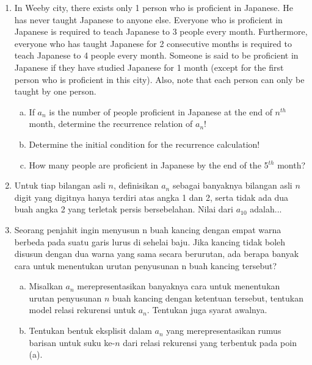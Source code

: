 \documentclass[12pt]{scrartcl}
\begin{document}
\begin{enumerate}
    Berapa minimal langkah yang dibutuhkan untuk memindahkan tumpukan yang berisi 10 piringan?

    \item In Weeby city, there exists only 1 person who is proficient in Japanese. He has never taught Japanese to anyone else. Everyone who is proficient in Japanese is required to teach Japanese to 3 people every month. Furthermore, everyone who has taught Japanese for 2 consecutive months is required to teach Japanese to 4 people every month. Someone is said to be proficient in Japanese if they have studied Japanese for 1 month (except for the first person who is proficient in this city). Also, note that each person can only be taught by one person.
    \begin{enumerate}[a.]
        \item If $a_n$ is the number of people proficient in Japanese at the end of $n^{th}$ month, determine the recurrence relation of $a_n$!
        \item Determine the initial condition for the recurrence calculation!
        \item How many people are proficient in Japanese by the end of the 5$^{th}$ month?
    \end{enumerate}
    
    
    
    \item Untuk tiap bilangan asli $n$, definisikan $a_n$ sebagai banyaknya bilangan asli $n$ digit yang digitnya hanya terdiri atas angka 1 dan 2, serta tidak ada dua buah angka 2 yang terletak persis bersebelahan. Nilai dari $a_{10}$ adalah...

    \item Seorang penjahit ingin menyusun n buah kancing dengan empat warna berbeda pada suatu garis lurus di sehelai baju. Jika kancing tidak boleh disusun dengan dua warna yang sama secara berurutan, ada berapa banyak cara untuk menentukan urutan penyusunan n buah kancing tersebut?
    \begin{enumerate}[a)]
        \item  Misalkan $a_n$ merepresentasikan banyaknya cara untuk menentukan urutan penyusunan $n$ buah kancing dengan ketentuan tersebut, tentukan model relasi rekurensi untuk $a_n$. Tentukan juga syarat awalnya.
        \item Tentukan bentuk eksplisit dalam $a_n$ yang merepresentasikan rumus barisan untuk suku ke-$n$ dari relasi rekurensi yang terbentuk pada poin (a).
    \end{enumerate}


\end{enumerate}
\end{document}
